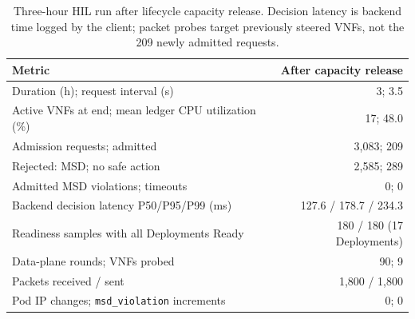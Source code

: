 \documentclass[final,5p]{elsarticle}
\newcommand{\rev}[1]{\textcolor{revisiongreen}{#1}}
\let\newrev\rev
\begin{document}
\begin{table}[t]
\centering
\caption{\newrev{Three-hour HIL run after lifecycle capacity release. Decision latency is backend time logged by the client; packet probes target previously steered VNFs, not the 209 newly admitted requests.}}
\label{tab:hil_longrun}
{\color{revisiongreen}
\small
\begin{tabular}{@{}lr@{}}
\toprule
Metric & After capacity release \\
\midrule
Duration (h); request interval (s) & 3; 3.5 \\
Active VNFs at end; mean ledger CPU utilization (\%) & 17; 48.0 \\
Admission requests; admitted & 3,083; 209 \\
Rejected: MSD; no safe action & 2,585; 289 \\
Admitted MSD violations; timeouts & 0; 0 \\
Backend decision latency P50/P95/P99 (ms) & 127.6 / 178.7 / 234.3 \\
Readiness samples with all Deployments Ready & 180 / 180 (17 Deployments) \\
Data-plane rounds; VNFs probed & 90; 9 \\
Packets received / sent & 1,800 / 1,800 \\
Pod IP changes; \texttt{msd\_violation} increments & 0; 0 \\
\bottomrule
\end{tabular}
}
\end{table}
\end{document}

